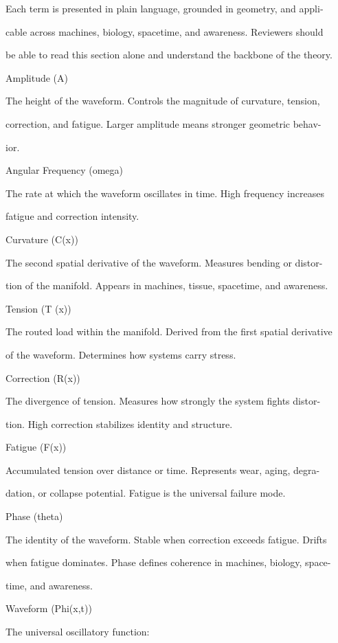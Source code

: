 \documentclass[10pt]{article}
\begin{document}
Each term is presented in plain language, grounded in geometry, and appli-

cable across machines, biology, spacetime, and awareness. Reviewers should

be able to read this section alone and understand the backbone of the theory.

Amplitude (A)

The height of the waveform. Controls the magnitude of curvature, tension,

correction, and fatigue. Larger amplitude means stronger geometric behav-

ior.

Angular Frequency (omega)

The rate at which the waveform oscillates in time. High frequency increases

fatigue and correction intensity.

Curvature (C(x))

The second spatial derivative of the waveform. Measures bending or distor-

tion of the manifold. Appears in machines, tissue, spacetime, and awareness.

Tension (T (x))

The routed load within the manifold. Derived from the first spatial derivative

of the waveform. Determines how systems carry stress.


Correction (R(x))

The divergence of tension. Measures how strongly the system fights distor-

tion. High correction stabilizes identity and structure.

Fatigue (F(x))

Accumulated tension over distance or time. Represents wear, aging, degra-

dation, or collapse potential. Fatigue is the universal failure mode.

Phase (theta)

The identity of the waveform. Stable when correction exceeds fatigue. Drifts

when fatigue dominates. Phase defines coherence in machines, biology, space-

time, and awareness.

Waveform (Phi(x,t))

The universal oscillatory function:
\end{document}
